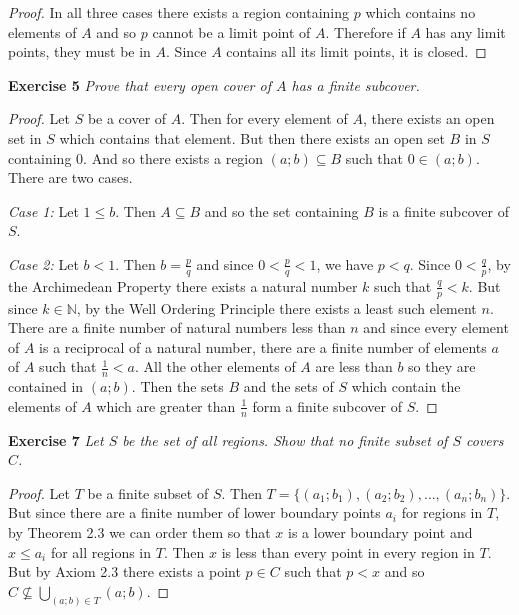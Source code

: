 \documentclass{article}
\begin{document}
\begin{flushleft}
\begin{proof}
In all three cases there exists a region containing $p$ which contains no elements of $A$ and so $p$ cannot be a limit point of $A$. Therefore if $A$ has any limit points, they must be in $A$. Since $A$ contains all its limit points, it is closed.
\end{proof}

\textbf{Exercise 5}
\textsl{Prove that every open cover of $A$ has a finite subcover.}
\begin{proof}
Let $S$ be a cover of $A$. Then for every element of $A$, there exists an open set in $S$ which contains that element. But then there exists an open set $B$ in $S$ containing $0$. And so there exists a region $(a;b) \subseteq B$ such that $0 \in (a;b)$. There are two cases.\newline

\textit{Case 1:} Let $1 \leq b$. Then $A \subseteq B$ and so the set containing $B$ is a finite subcover of $S$.\newline

\textit{Case 2:} Let $b<1$. Then $b=\frac{p}{q}$ and since $0 < \frac{p}{q} < 1$, we have $p<q$. Since $0<\frac{q}{p}$, by the Archimedean Property there exists a natural number $k$ such that $\frac{q}{p} < k$. But since $k \in \mathbb{N}$, by the Well Ordering Principle there exists a least such element $n$. There are a finite number of natural numbers less than $n$ and since every element of $A$ is a reciprocal of a natural number, there are a finite number of elements $a$ of $A$ such that $\frac{1}{n} < a$. All the other elements of $A$ are less than $b$ so they are contained in $(a;b)$. Then the sets $B$ and the sets of $S$ which contain the elements of $A$ which are greater than $\frac{1}{n}$ form a finite subcover of $S$.
\end{proof}

\textbf{Exercise 7}
\textsl{Let $S$ be the set of all regions. Show that no finite subset of $S$ covers $C$.}
\begin{proof}
Let $T$ be a finite subset of $S$. Then $T=\{(a_1;b_1),(a_2;b_2), \dots ,(a_n;b_n)\}$. But since there are a finite number of lower boundary points $a_i$ for regions in $T$, by Theorem 2.3 we can order them so that $x$ is a lower boundary point and $x \leq a_i$ for all regions in $T$. Then $x$ is less than every point in every region in $T$. But by Axiom 2.3 there exists a point $p \in C$ such that $p < x$ and so $C \nsubseteq \bigcup_{(a;b) \in T} (a;b)$.
\end{proof}


\end{flushleft}
\end{document}
